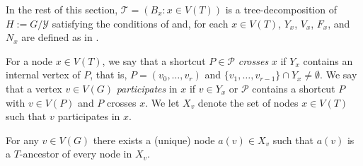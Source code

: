 \documentclass{patmorin}
\begin{document}



In the rest of this section, 
$\mathcal{T}=(B_x:x\in V(T))$ is a tree-decomposition of $H:=G/\mathcal{Y}$ satisfying the conditions of  and, for each $x\in V(T)$, $Y_x$, $V_x$, $F_x$, and $N_x$ are defined as in .

For a node $x\in V(T)$, we say that a shortcut $P\in\mathcal{P}$ \emph{crosses} $x$ if $Y_x$ contains an internal vertex of $P$, that is, $P=(v_0,\ldots,v_r)$ and $\{v_1,\ldots,v_{r-1}\}\cap Y_x\neq\emptyset$.  We say that a vertex $v\in V(G)$ \emph{participates} in $x$ if $v\in Y_x$ or $\mathcal{P}$ contains a shortcut $P$ with $v\in V(P)$ and $P$ crosses $x$. We let $X_v$ denote the set of nodes $x\in V(T)$ such that $v$ participates in $x$.

\begin{clm}
  For any $v\in V(G)$ there exists a (unique) node $a(v)\in X_v$ such that
  $a(v)$ is a $T$-ancestor of every node in $X_v$.
\end{clm}
\end{document}

